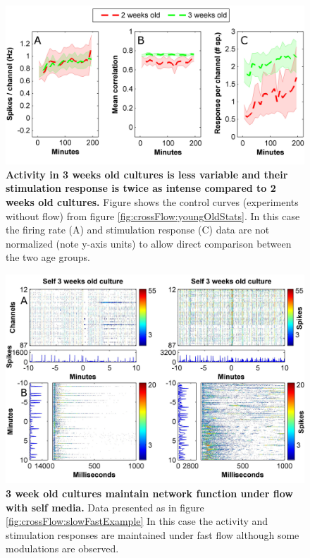        \begin{figure}[h]
            \centering
            \includegraphics[width=14.5cm]{appendix/youngOldCompare.jpg}
            \caption[Comparison of activity measures for 2 and 3 week old cultures]{\textbf{Activity in 3 weeks old cultures is less variable and their stimulation response is twice as intense compared to 2 weeks old cultures.} Figure shows the control curves (experiments without flow) from figure \ref{fig:crossFlow:youngOldStats}. In this case the firing rate (A) and stimulation response (C) data are not normalized (note y-axis units) to allow direct comparison between the two age groups.}

            \label{fig:app:youngOldCompare}

        \end{figure}

        \begin{figure}[!htb]
            \centering
            \includegraphics[width=15cm]{chapter5/figures/moreOldExamples/moreOldRasterExamples.jpg}
            \caption[Further examples for 3 weeks old cultures under flow with self media]{\textbf{3 week old cultures maintain network function under flow with self media.} Data presented as in figure \ref{fig:crossFlow:slowFastExample} In this case the activity and stimulation responses are maintained under fast flow although some modulations are observed.}
            \label{fig:crossFlow:moreOldExamplesRaster}
        \end{figure}

